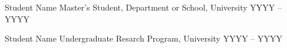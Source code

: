 


\begin{cvhonors}

  \cvhonor
    {Student Name} %
    {Master's Student, Department or School, University} %
    {} %
    {YYYY -- YYYY} %
    
\cvhonor
    {Student Name} %
    {Undergraduate Resarch Program, University} %
    {} %
    {YYYY -- YYYY} %
\end{cvhonors}
